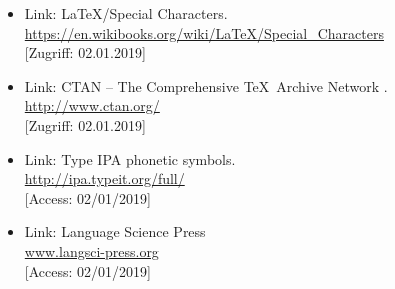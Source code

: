 \documentclass[a4paper,10pt,handout]{beamer}
\begin{document}
\begin{frame}[allowframebreaks]
{\begin{itemize}
		\item Link: \LaTeX /Special Characters.\\
		\url{https://en.wikibooks.org/wiki/LaTeX/Special_Characters}\\
		{[}Zugriff: 02.01.2019]
		
		\item Link: CTAN -- The Comprehensive \TeX\ Archive Network .\\
		\url{http://www.ctan.org/}\\
		{[}Zugriff: 02.01.2019]
		
		\item Link: Type IPA phonetic symbols.\\
		\url{http://ipa.typeit.org/full/}\\
		{[}Access: 02/01/2019]
		
		\item Link: Language Science Press\\
		\url{www.langsci-press.org}\\
		{[}Access: 02/01/2019]		

%		
%		
%		
%		
		
	\end{itemize}
}

\end{frame}
\end{document}
